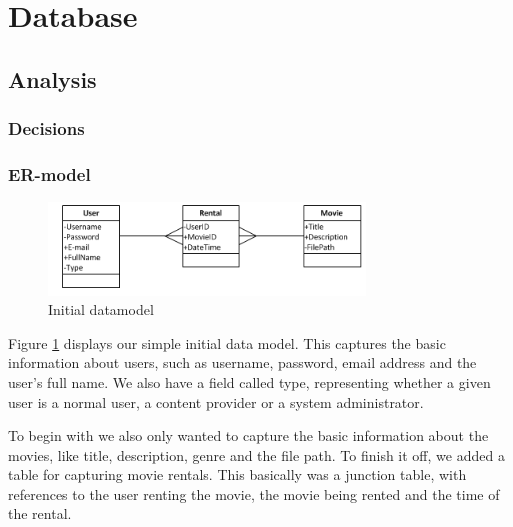 \section{Database}
\label{Design_Database}

\subsection{Analysis}
\label{Design_Database_Analysis}

\subsubsection{Decisions}
\label{Design_Database_Analysis_Decisions}

\subsubsection{ER-model}
\label{Design_Database_Analysis_ERmodel}

\begin{figure}[h!]  
  \centering
    \includegraphics[width=0.75\textwidth]{Parts/Images/Design/Database/Datamodel_Initial}
  \caption{Initial datamodel}
  \label{fig:Design_Database_Analysis_ERmodel_Initial}
\end{figure}

Figure \ref{fig:Design_Database_Analysis_ERmodel_Initial} displays our simple initial data model. This captures the basic information about users, such as username, password, email address and the user's full name. We also have a field called type, representing whether a given user is a normal user, a content provider or a system administrator.

To begin with we also only wanted to capture the basic information about the movies, like title, description, genre and the file path. To finish it off, we added a table for capturing movie rentals. This basically was a junction table, with references to the user renting the movie, the movie being rented and the time of the rental.


